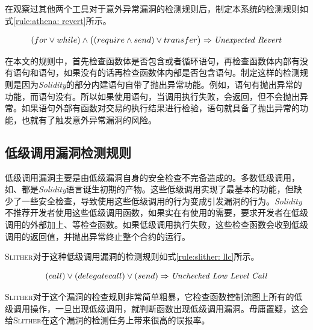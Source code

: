 在观察过其他两个工具对于意外异常漏洞的检测规则后，制定本系统的检测规则如式\ref{rule:athena: revert}所示。
\begin{mdframed}[
	linewidth = 1pt,
	innertopmargin = -5pt,
	innerbottommargin = 3pt,
	outerlinewidth = 1pt
	]
    \small
	\begin{equation} \label{rule:athena: revert}
    (for \vee while) \wedge \big ((require \wedge send) \vee transfer \big )  \Rightarrow \text{\emph{Unexpected Revert}}
	\end{equation}
\end{mdframed}
在本文的规则中，首先检查函数体是否包含或者循环语句，再检查函数体内部有没有语句和语句，如果没有的话再检查函数体内部是否包含语句。制定这样的检测规则是因为\emph{Solidity}的部分内建语句自带了抛出异常功能。例如，语句有抛出异常的功能，而语句没有。所以如果使用语句，当调用执行失败，会返回，但不会抛出异常。如果语句外部有函数对交易的执行结果进行检验，语句就具备了抛出异常的功能，也就有了触发意外异常漏洞的风险。

\subsection{低级调用漏洞检测规则}
低级调用漏洞主要是由低级漏洞自身的安全检查不完备造成的。多数低级调用，如、都是\emph{Solidity}语言诞生初期的产物。这些低级调用实现了最基本的功能，但缺少了一些安全检查，导致使用这些低级调用的行为变成引发漏洞的行为。\emph{Solidity}不推荐开发者使用这些低级调用函数，如果实在有使用的需要，要求开发者在低级调用的外部加上、等检查函数。如果低级调用执行失败，这些检查函数会收到低级调用的返回值，并抛出异常终止整个合约的运行。

\textsc{Slither}对于这种低级调用漏洞的检测规则如式\ref{rule:slither: llc}所示。
\begin{mdframed}[
	linewidth = 1pt,
	innertopmargin = -5pt,
	innerbottommargin = 3pt,
	outerlinewidth = 1pt
	]
    \small
	\begin{equation} \label{rule:slither: llc}
    ( call) \vee (delegatecall) \vee (send) \Rightarrow \text{\emph{Unchecked Low Level Call}}
	\end{equation}
\end{mdframed}
\textsc{Slither}对于这个漏洞的检查规则非常简单粗暴，它检查函数控制流图上所有的低级调用操作，一旦出现低级调用，就判断函数出现低级调用漏洞。毋庸置疑，这会给\textsc{Slither}在这个漏洞的检测任务上带来很高的误报率。

